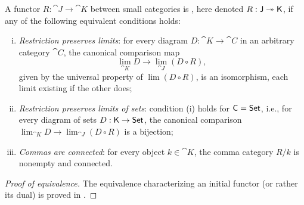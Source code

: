 \documentclass[11pt]{article}
\numberwithin{equation}{section}
\begin{document}
\begin{definition}
  \label{def:initial-functor}
  A functor $R: \cat{J} \to \cat{K}$ between small categories is ,
  here denoted $R: \mathsf{J} \twoheadrightarrow \mathsf{K}$, if any of the following
  equivalent conditions holds:
  \begin{enumerate}[(i)]
    \item \emph{Restriction preserves limits}: for every diagram
      $D: \cat{K} \to \cat{C}$ in an arbitrary category $\cat{C}$, the canonical
      comparison map
      \begin{equation*}
        \textstyle \lim_{\cat{K}} D \to \lim_{\cat{J}} (D \circ R),
      \end{equation*}
      given by the universal property of $\lim(D \circ R)$, is an isomorphism,
      each limit existing if the other does;
    \item \emph{Restriction preserves limits of sets}: condition (i) holds for
      $\mathsf{C} = \mathsf{Set}$, i.e., for every diagram of sets $D: \mathsf{K} \to \mathsf{Set}$,
      the canonical comparison $\lim_{\cat{K}} D \to \lim_{\cat{J}} (D \circ R)$
      is a bijection;
    \item \emph{Commas are connected}: for every object $k \in \cat{K}$, the comma
      category $R/k$ is nonempty and connected. \qedhere
  \end{enumerate}
\end{definition}
\begin{proof}[Proof of equivalence]
  The equivalence characterizing an initial functor (or rather its dual) is
  proved in \cite[\mbox{Lemma 8.3.4}]{riehl2014}.
\end{proof}
\end{document}
